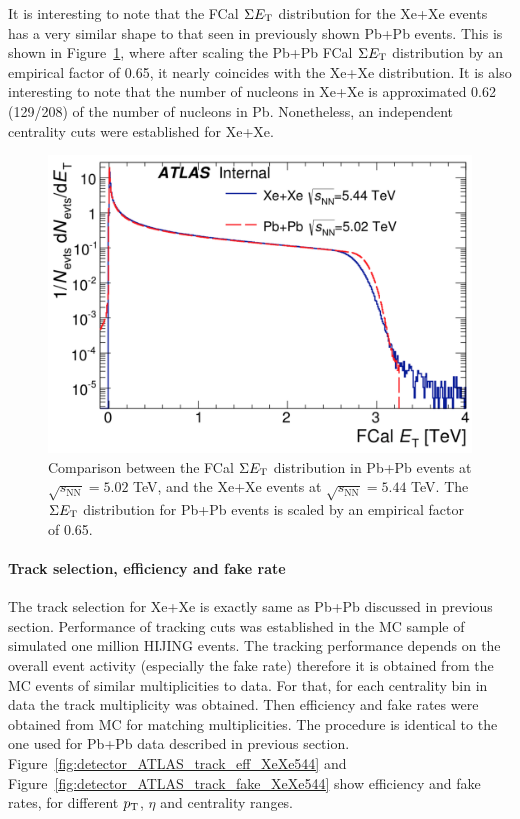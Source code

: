 It is interesting to note that the FCal $\Sigma E_\text{T}$ distribution for the Xe+Xe events has a very similar shape to that seen in previously shown Pb+Pb events. This is shown in Figure~\ref{fig:detector_ATLAS_centrality_XePb}, where after scaling the Pb+Pb FCal $\Sigma E_\text{T}$ distribution by an empirical factor of 0.65, it nearly coincides with the Xe+Xe distribution. It is also interesting to note that the number of nucleons in Xe+Xe is approximated 0.62 (129/208) of the number of nucleons in Pb. Nonetheless, an independent centrality cuts were established for Xe+Xe.

\begin{figure}[H]
\centering
\includegraphics[width=.6\linewidth]{figs/chapter_detector/ATLAS_centrality_XePb.png}
\caption{Comparison between the FCal $\Sigma E_\text{T}$ distribution in Pb+Pb events at $\sqrt{s_\text{NN}}=5.02$ TeV, and the Xe+Xe events at $\sqrt{s_\text{NN}}=5.44$ TeV. The $\Sigma E_\text{T}$ distribution for Pb+Pb events is scaled by an empirical factor of 0.65.}
\label{fig:detector_ATLAS_centrality_XePb}
\end{figure}



\paragraph{Track selection, efficiency and fake rate}

The track selection for Xe+Xe is exactly same as Pb+Pb discussed in previous section. Performance of tracking cuts was established in the MC sample of simulated one million HIJING events. The tracking performance depends on the overall event activity (especially the fake rate) therefore it is obtained from the MC events of similar multiplicities to data. For that, for each centrality bin in data the track multiplicity was obtained. Then efficiency and fake rates were obtained from MC for matching multiplicities. The procedure is identical to the one used for Pb+Pb data described in previous section. Figure~\ref{fig:detector_ATLAS_track_eff_XeXe544} and Figure~\ref{fig:detector_ATLAS_track_fake_XeXe544} show efficiency and fake rates, for different $p_\text{T}$, $\eta$ and centrality ranges.

